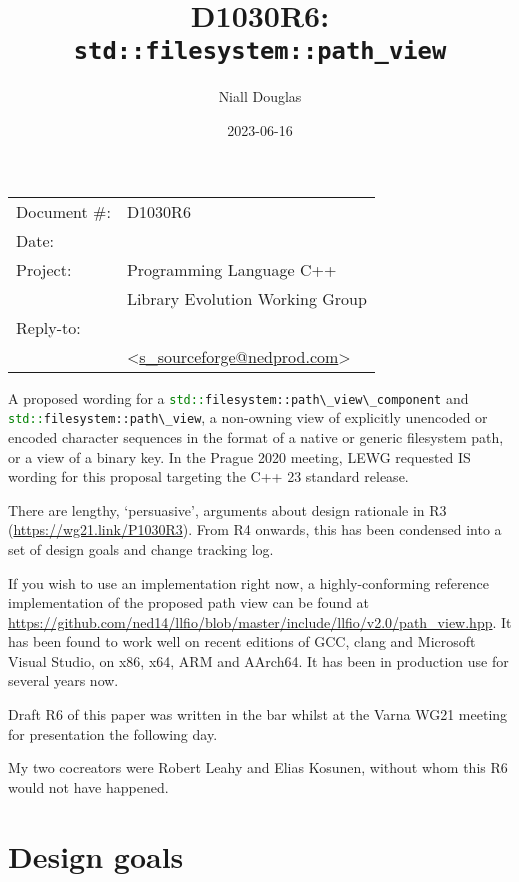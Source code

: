 \documentclass[11pt]{article}
\date{}
\title{D1030R6: \texttt{std::filesystem::path\_view}}
\makeatletter
\newcommand{\code}[2][cpp]{\lstinline[language=#1,basicstyle=\small\ttfamily]{#2}}
\newcommand{\emailaddress}{s\_sourceforge@nedprod.com}
\newcommand{\email}{\href{mailto:\emailaddress}{\emailaddress}}
\makeatother
\begin{document}
\maketitle\vspace{-2cm}

\begin{flushright}
  \begin{tabular}{ll}
  Document \#:&D1030R6\\
  Date:       &\date{2023-06-16}\\
  Project:    &Programming Language C++\\
              &Library Evolution Working Group\\
  Reply-to:   &\author{Niall Douglas}\\
              &\textless\email\textgreater
  \end{tabular}
\end{flushright}

A proposed wording for a \code{std::filesystem::path\_view\_component} and \code{std::filesystem::path\_view}, a non-owning view of explicitly unencoded or encoded character sequences in the format of a native or generic filesystem path, or a view of a binary key. In the Prague 2020 meeting, LEWG requested IS wording for this proposal targeting the C++ 23 standard release.

There are lengthy, `persuasive', arguments about design rationale in R3 (\url{https://wg21.link/P1030R3}). From R4 onwards, this has been condensed into a set of design goals and change tracking log.

If you wish to use an implementation right now, a highly-conforming reference implementation of the proposed path view can be found at \url{https://github.com/ned14/llfio/blob/master/include/llfio/v2.0/path\_view.hpp}. It has been found to work well on recent editions of GCC, clang and Microsoft Visual Studio, on x86, x64, ARM and AArch64. It has been in production use for several years now.

Draft R6 of this paper was written in the bar whilst at the Varna WG21 meeting
for presentation the following day.

My two cocreators were Robert Leahy and Elias Kosunen, without whom this
R6 would not have happened.

\tableofcontents

\section{Design goals}
\end{document}
